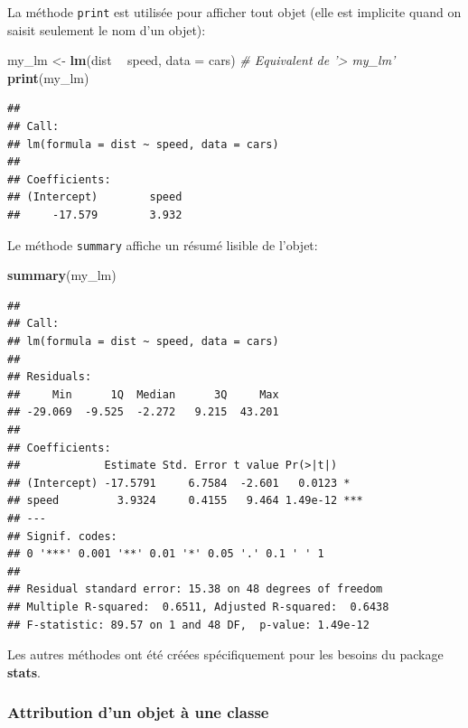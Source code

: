 \documentclass[
  12pt,
  french,
  a4paper,
  extrafontsizes,onecolumn,openright
  ]{memoir}
\newenvironment{Shaded}{\begin{snugshade}}{\end{snugshade}}
\newcommand{\CommentTok}[1]{\textcolor[rgb]{0.56,0.35,0.01}{\textit{#1}}}
\newcommand{\DataTypeTok}[1]{\textcolor[rgb]{0.13,0.29,0.53}{#1}}
\newcommand{\KeywordTok}[1]{\textcolor[rgb]{0.13,0.29,0.53}{\textbf{#1}}}
\newcommand{\NormalTok}[1]{#1}
\newcommand{\OperatorTok}[1]{\textcolor[rgb]{0.81,0.36,0.00}{\textbf{#1}}}
\newcommand{\StringTok}[1]{\textcolor[rgb]{0.31,0.60,0.02}{#1}}
\begin{document}
\normalsize
La méthode \texttt{print} est utilisée pour afficher tout objet (elle est implicite quand on saisit seulement le nom d'un objet):

\scriptsize

\begin{Shaded}
\begin{Highlighting}[]
\NormalTok{my_lm <-}\StringTok{ }\KeywordTok{lm}\NormalTok{(dist }\OperatorTok{~}\StringTok{ }\NormalTok{speed, }\DataTypeTok{data =}\NormalTok{ cars)}
\CommentTok{# Equivalent de '> my_lm'}
\KeywordTok{print}\NormalTok{(my_lm)}
\end{Highlighting}
\end{Shaded}

\begin{verbatim}
## 
## Call:
## lm(formula = dist ~ speed, data = cars)
## 
## Coefficients:
## (Intercept)        speed  
##     -17.579        3.932
\end{verbatim}

\normalsize
Le méthode \texttt{summary} affiche un résumé lisible de l'objet:

\scriptsize

\begin{Shaded}
\begin{Highlighting}[]
\KeywordTok{summary}\NormalTok{(my_lm)}
\end{Highlighting}
\end{Shaded}

\begin{verbatim}
## 
## Call:
## lm(formula = dist ~ speed, data = cars)
## 
## Residuals:
##     Min      1Q  Median      3Q     Max 
## -29.069  -9.525  -2.272   9.215  43.201 
## 
## Coefficients:
##             Estimate Std. Error t value Pr(>|t|)    
## (Intercept) -17.5791     6.7584  -2.601   0.0123 *  
## speed         3.9324     0.4155   9.464 1.49e-12 ***
## ---
## Signif. codes:  
## 0 '***' 0.001 '**' 0.01 '*' 0.05 '.' 0.1 ' ' 1
## 
## Residual standard error: 15.38 on 48 degrees of freedom
## Multiple R-squared:  0.6511, Adjusted R-squared:  0.6438 
## F-statistic: 89.57 on 1 and 48 DF,  p-value: 1.49e-12
\end{verbatim}

\normalsize

Les autres méthodes ont été créées spécifiquement pour les besoins du package \textbf{stats}.

\hypertarget{attribution-dun-objet-uxe0-une-classe}{%
\subsubsection{Attribution d'un objet à une classe}\label{attribution-dun-objet-uxe0-une-classe}}
\end{document}
